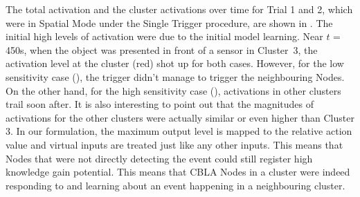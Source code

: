 The total activation and the cluster activations over time for Trial 1 and 2, which were in Spatial Mode under the Single Trigger procedure, are shown in . 
The initial high levels of activation were due to the initial model learning. 
Near $t$ = 450s, when the object was presented in front of a sensor in Cluster~3, the activation level at the cluster (red) shot up for both cases. However, for the low sensitivity case (), the trigger didn't manage to trigger the neighbouring Nodes. On the other hand, for the high sensitivity case (), activations in other clusters trail soon after. It is also interesting to point out that the magnitudes of activations for the other clusters were actually similar or even higher than Cluster 3. In our formulation, the maximum output level is mapped to the relative action value and virtual inputs are treated just like any other inputs. This means that Nodes that were not directly detecting the event could still register high knowledge gain potential. This means that CBLA Nodes in a cluster were indeed responding to and learning about an event happening in a neighbouring cluster.

